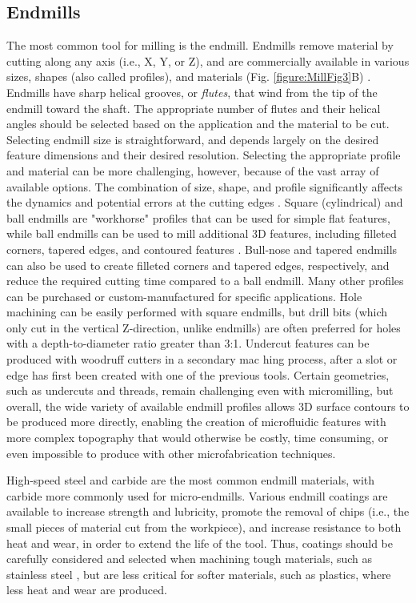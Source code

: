 \subsection{Endmills}
The most common tool for milling is the endmill. Endmills remove material by cutting along any axis (i.e., X, Y, or Z), and are commercially available in various sizes, shapes (also called profiles), and materials (Fig. \ref{figure:MillFig3}B) \cite{Kim2008}. Endmills have sharp helical grooves, or \textit{flutes}, that wind from the tip of the endmill toward the shaft. The appropriate number of flutes and their helical angles should be selected based on the application and the material to be cut. Selecting endmill size is straightforward, and depends largely on the desired feature dimensions and their desired resolution. Selecting the appropriate profile and material can be more challenging, however, because of the vast array of available options. The combination of size, shape, and profile significantly affects the dynamics and potential errors at the cutting edges \cite{Jun2006}. Square (cylindrical) and ball endmills are "workhorse" profiles that can be used for simple flat features, while ball endmills can be used to mill additional 3D features, including filleted corners, tapered edges, and contoured features \cite{Wilson2011}. Bull-nose and tapered endmills can also be used to create filleted corners and tapered edges, respectively, and reduce the required cutting time compared to a ball endmill. Many other profiles can be purchased or custom-manufactured for specific applications. Hole machining can be easily performed with square endmills, but drill bits (which only cut in the vertical Z-direction, unlike endmills) are often preferred for holes with a depth-to-diameter ratio greater than 3:1. Undercut features can be produced with woodruff cutters in a secondary mac hing process, after a slot or edge has first been created with one of the previous tools. Certain geometries, such as undercuts and threads, remain challenging even with micromilling, but overall, the wide variety of available endmill profiles allows 3D surface contours to be produced more directly, enabling the creation of microfluidic features with more complex topography that would otherwise be costly, time consuming, or even impossible to produce with other microfabrication techniques.

High-speed steel and carbide are the most common endmill materials, with carbide more commonly used for micro-endmills. Various endmill coatings are available to increase strength and lubricity, promote the removal of chips (i.e., the small pieces of material cut from the workpiece), and increase resistance to both heat and wear, in order to extend the life of the tool. Thus, coatings should be carefully considered and selected when machining tough materials, such as stainless steel \cite{Aramchareon2008, Endrino2006}, but are less critical for softer materials, such as plastics, where less heat and wear are produced. 

